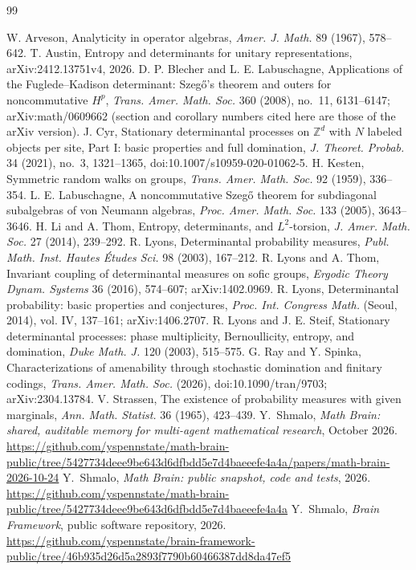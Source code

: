 \documentclass[11pt]{amsart}
\theoremstyle{remark}
\theoremstyle{definition}
\begin{document}
\begin{thebibliography}{99}\raggedright
{} W. Arveson, Analyticity in operator algebras, \emph{Amer. J. Math.} 89 (1967), 578--642.
 T. Austin, Entropy and determinants for unitary representations, arXiv:2412.13751v4, 2026.
 D. P. Blecher and L. E. Labuschagne, Applications of the Fuglede--Kadison determinant: Szeg\H{o}'s
theorem and outers for noncommutative $H^p$, \emph{Trans. Amer. Math. Soc.} 360 (2008), no.~11, 6131--6147; arXiv:math/0609662 (section and corollary numbers
cited here are those of the arXiv version).
 J. Cyr, Stationary determinantal processes on $\mathbb Z^d$ with $N$ labeled objects per site, Part I:
basic properties and full domination, \emph{J. Theoret. Probab.} 34 (2021), no.~3, 1321--1365,
doi:10.1007/s10959-020-01062-5.
 H. Kesten, Symmetric random walks on groups, \emph{Trans. Amer. Math. Soc.} 92 (1959), 336--354.
 L. E. Labuschagne, A noncommutative Szeg\H{o} theorem for subdiagonal subalgebras of von Neumann
algebras, \emph{Proc. Amer. Math. Soc.} 133 (2005), 3643--3646.
 H. Li and A. Thom, Entropy, determinants, and $L^2$-torsion, \emph{J. Amer. Math. Soc.} 27 (2014),
239--292.
 R. Lyons, Determinantal probability measures, \emph{Publ. Math. Inst. Hautes \'Etudes Sci.} 98 (2003),
167--212.
 R. Lyons and A. Thom, Invariant coupling of determinantal measures on sofic groups, \emph{Ergodic
Theory Dynam. Systems} 36 (2016), 574--607; arXiv:1402.0969.
 R. Lyons, Determinantal probability: basic properties and conjectures, \emph{Proc. Int. Congress
Math.} (Seoul, 2014), vol. IV, 137--161; arXiv:1406.2707.
 R. Lyons and J. E. Steif, Stationary determinantal processes: phase multiplicity, Bernoullicity,
entropy, and domination, \emph{Duke Math. J.} 120 (2003), 515--575.
 G. Ray and Y. Spinka, Characterizations of amenability through stochastic domination and finitary codings,
\emph{Trans. Amer. Math. Soc.} (2026), doi:10.1090/tran/9703; arXiv:2304.13784.
 V. Strassen, The existence of probability measures with given marginals, \emph{Ann. Math. Statist.}
36 (1965), 423--439.
Y.~Shmalo, \emph{Math Brain: shared, auditable memory for multi-agent mathematical research}, October 2026.
\url{https://github.com/yspennstate/math-brain-public/tree/5427734deee9be643d6dfbdd5e7d4baeeefe4a4a/papers/math-brain-2026-10-24}
Y.~Shmalo, \emph{Math Brain: public snapshot, code and tests}, 2026.
\url{https://github.com/yspennstate/math-brain-public/tree/5427734deee9be643d6dfbdd5e7d4baeeefe4a4a}
Y.~Shmalo, \emph{Brain Framework}, public software repository, 2026.
\url{https://github.com/yspennstate/brain-framework-public/tree/46b935d26d5a2893f7790b60466387dd8da47ef5}
\end{thebibliography}
\end{document}
